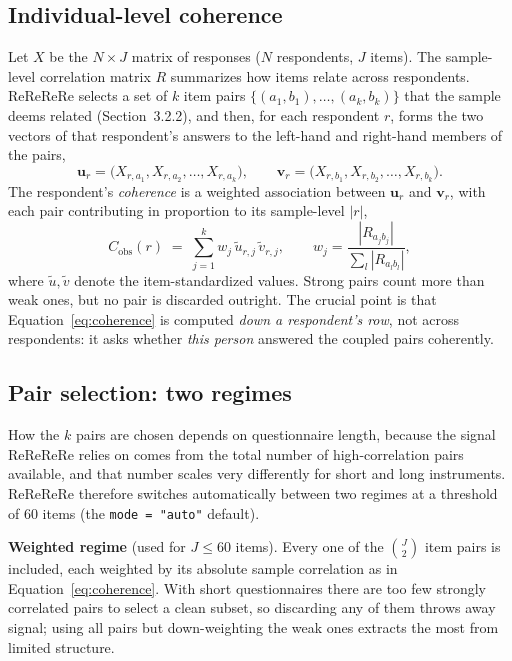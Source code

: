 \subsection{Individual-level coherence}

Let $X$ be the $N \times J$ matrix of responses ($N$ respondents, $J$ items).
The sample-level correlation matrix $R$ summarizes how items relate across
respondents. ReReReRe selects a set of $k$ item pairs $\{(a_1,b_1),\dots,
(a_k,b_k)\}$ that the sample deems related (Section~3.2.2), and then, for each
respondent $r$, forms the two vectors of that respondent's answers to the
left-hand and right-hand members of the pairs,
\[
\mathbf{u}_r = \big(X_{r,a_1}, X_{r,a_2}, \dots, X_{r,a_k}\big), \qquad
\mathbf{v}_r = \big(X_{r,b_1}, X_{r,b_2}, \dots, X_{r,b_k}\big).
\]
The respondent's \emph{coherence} is a weighted association between
$\mathbf{u}_r$ and $\mathbf{v}_r$, with each pair contributing in proportion to
its sample-level $|r|$,
\begin{equation}
C_{\text{obs}}(r) \;=\; \sum_{j=1}^{k} w_j \, \tilde{u}_{r,j}\,\tilde{v}_{r,j},
\qquad w_j = \frac{|R_{a_j b_j}|}{\sum_{l} |R_{a_l b_l}|},
\label{eq:coherence}
\end{equation}
where $\tilde{u}, \tilde{v}$ denote the item-standardized values. Strong pairs
count more than weak ones, but no pair is discarded outright. The crucial point
is that Equation~\ref{eq:coherence} is computed \emph{down a respondent's row},
not across respondents: it asks whether \emph{this person} answered the coupled
pairs coherently.

\subsection{Pair selection: two regimes}

How the $k$ pairs are chosen depends on questionnaire length, because the signal
ReReReRe relies on comes from the total number of high-correlation pairs
available, and that number scales very differently for short and long
instruments. ReReReRe therefore switches automatically between two regimes at a
threshold of 60 items (the \texttt{mode = "auto"} default).

\textbf{Weighted regime} (used for $J \le 60$ items). Every one of the
$\binom{J}{2}$ item pairs is included, each weighted by its absolute sample
correlation as in Equation~\ref{eq:coherence}. With short questionnaires there
are too few strongly correlated pairs to select a clean subset, so discarding
any of them throws away signal; using all pairs but down-weighting the weak ones
extracts the most from limited structure.

